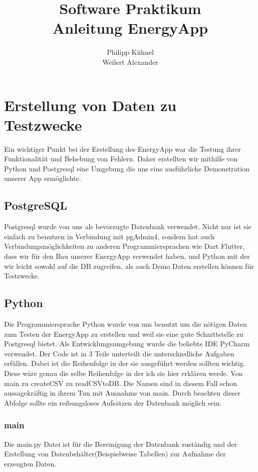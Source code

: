 \documentclass[11pt]{scrartcl}
\title{
  Software Praktikum \\
  {\large Anleitung EnergyApp}}
\author{
  \large Philipp Kühnel \\
  \large Weilert Alexander
}
\begin{document}
\maketitle

\section*{Erstellung von Daten zu Testzwecke}

Ein wichtiger Punkt bei der Erstellung des EnergyApp war die Testung ihrer Funktionalität und Behebung von Fehlern. Daher erstellten wir mithilfe von Python und Postgresql eine Umgebung die uns eine ausführliche Demonstration unserer App ermöglichte.

\subsection*{PostgreSQL}
Postgresql wurde von uns als bevorzugte Datenbank verwendet. Nicht nur ist sie einfach zu benutzen in Verbindung mit pgAdmin4, sondern hat auch Verbindungsmöglichkeiten zu anderen Programmiersprachen wie Dart Flutter, dass wir für den Bau unserer EnergyApp verwendet haben, und Python mit der wir leicht sowohl auf die DB zugreifen, als auch Demo Daten erstellen können für Testzwecke.

\subsection*{Python}

Die Programmiersprache Python wurde von uns benutzt um die nötigen Daten zum Testen der EnergyApp zu erstellen und weil sie eine gute Schnittstelle zu Postgresql bietet. Als Entwicklungsumgebung wurde die beliebte IDE PyCharm verwendet. Der Code ist in 3 Teile unterteilt die unterschiedliche Aufgaben erfüllen. Dabei ist die Reihenfolge in der sie ausgeführt werden sollten wichtig. Diese wäre genau die selbe Reihenfolge in der ich sie hier erklären werde. Von main zu createCSV zu readCSVtoDB. Die Namen sind in diesem Fall schon aussagekräftig in ihrem Tun mit Ausnahme von main. Durch beachten dieser Abfolge sollte ein reibungsloses Aufsätzen der Datenbank möglich sein.

\subsubsection*{main} 

Die main.py Datei ist für die Bereinigung der Datenbank zuständig und der Erstellung von Datenbehälter(Beispielweise Tabellen) zur Aufnahme der erzeugten Daten. 
\end{document}
